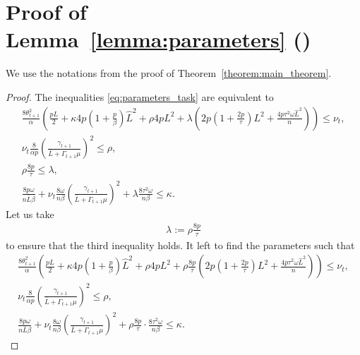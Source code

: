 \documentclass{article} %
\theoremstyle{plain}
\theoremstyle{definition}
\theoremstyle{remark}
\newcommand{\eqdef}{:=}
\begin{document}
\section{Proof of Lemma~\ref{lemma:parameters} ()}
\label{sec:lemma_parameters}

We use the notations from the proof of Theorem~\ref{theorem:main_theorem}.
\LEMMAPARAMETERS*

\begin{proof}
  The inequalities \eqref{eq:parameters_task} are equivalent to 
  \begin{equation*}
    \begin{gathered}
      \frac{8 \theta_{t+1}^2}{\alpha} \left(\frac{pL}{2} + \kappa 4 p \left(1 + \frac{p}{\beta}\right) \widehat{L}^2 + \rho 4 p L^2 + \lambda \left(2 p \left(1 + \frac{2 p}{\tau}\right) L^2 + \frac{4 p \tau^2 \omega \widehat{L}^2}{n}\right) \right) \leq \nu_{t}, \\
      \nu_{t} \frac{8}{\alpha p} \left(\frac{\gamma_{t+1}}{\bar{L} + \Gamma_{t+1} \mu}\right)^2 \leq \rho, \\
      \rho\frac{8 p}{\tau} \leq \lambda, \\
      \frac{8 p \omega}{n \bar{L} \beta} + \nu_{t} \frac{8 \omega}{n \beta} \left(\frac{\gamma_{t+1}}{\bar{L} + \Gamma_{t+1} \mu}\right)^2 + \lambda \frac{8 \tau^2 \omega}{n \beta}\leq \kappa.
    \end{gathered}
    \end{equation*}
  Let us take 
  \begin{align}
    \lambda \eqdef \rho\frac{8 p}{\tau} 
    \label{eq:lambda_sol}
  \end{align}
    to ensure that the third inequality holds. It left to find the parameters such that
  \begin{equation*}
  \begin{gathered}
      \frac{8 \theta_{t+1}^2}{\alpha} \left(\frac{pL}{2} + \kappa 4 p \left(1 + \frac{p}{\beta}\right) \widehat{L}^2 + \rho 4 p L^2 + \rho\frac{8 p}{\tau} \left(2 p \left(1 + \frac{2 p}{\tau}\right) L^2 + \frac{4 p \tau^2 \omega \widehat{L}^2}{n}\right) \right) \leq \nu_{t}, \\
      \nu_{t} \frac{8}{\alpha p} \left(\frac{\gamma_{t+1}}{\bar{L} + \Gamma_{t+1} \mu}\right)^2 \leq \rho, \\
      \frac{8 p \omega}{n \bar{L} \beta} + \nu_{t} \frac{8 \omega}{n \beta} \left(\frac{\gamma_{t+1}}{\bar{L} + \Gamma_{t+1} \mu}\right)^2 + \rho\frac{8 p}{\tau} \cdot \frac{8 \tau^2 \omega}{n \beta}\leq \kappa.

\end{gathered}
\end{equation*}
\end{proof}
\end{document}
